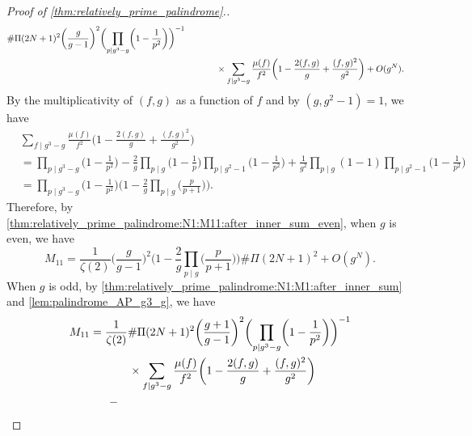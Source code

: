 \documentclass{amsart}
\theoremstyle{plain}
\theoremstyle{definition}
\begin{document}
\begin{proof}[Proof of \cref{thm:relatively_prime_palindrome}.]
\begin{equation}
\begin{aligned}
\#\Pi(2N+1)^{2}
\biggl(\frac{g}{g-1}\biggr)^{2}
\biggl(\prod_{p\mid g^{3}-g}\biggl(1-\frac{1}{p^{2}}\biggr)\biggr)^{-1}\\
&\hspace{0.1\textwidth}
\times
\sum_{f\mid g^{3}-g}
\frac{\mu(f)}{f^{2}}
\biggl(1-\frac{2(f,g)}{g}+\frac{(f,g)^{2}}{g^{2}}\biggr)
+
O(g^{N}).
\end{aligned}
\end{equation}
By the multiplicativity of $(f,g)$ as a function of $f$ and by $(g,g^{2}-1)=1$, we have
\begin{equation}
\label{thm:relatively_prime_palindrome:N1:M11:f_product}
\begin{aligned}
&\sum_{f\mid g^{3}-g}
\frac{\mu(f)}{f^{2}}
\biggl(1-\frac{2(f,g)}{g}+\frac{(f,g)^{2}}{g^{2}}\biggr)\\
&=
\prod_{p\mid g^{3}-g}\biggl(1-\frac{1}{p^{2}}\biggr)
-
\frac{2}{g}
\prod_{p\mid g}\biggl(1-\frac{1}{p}\biggr)
\prod_{p\mid g^{2}-1}\biggl(1-\frac{1}{p^{2}}\biggr)
+
\frac{1}{g^{2}}
\prod_{p\mid g}(1-1)
\prod_{p\mid g^{2}-1}\biggl(1-\frac{1}{p^{2}}\biggr)\\
&=
\prod_{p\mid g^{3}-g}\biggl(1-\frac{1}{p^{2}}\biggr)
\biggl(
1-\frac{2}{g}\prod_{p\mid g}\biggl(\frac{p}{p+1}\biggr)
\biggr).
\end{aligned}
\end{equation}
Therefore, by \cref{thm:relatively_prime_palindrome:N1:M11:after_inner_sum_even}, when $g$ is even, we have
\begin{equation}
\label{thm:relatively_prime_palindrome:N1:M11:g_even}
M_{11}
=
\frac{1}{\zeta(2)}
\biggl(\frac{g}{g-1}\biggr)^{2}
\biggl(
1-\frac{2}{g}\prod_{p\mid g}\biggl(\frac{p}{p+1}\biggr)
\biggr)
\#\Pi(2N+1)^{2}
+
O(g^{N}).
\end{equation}
When $g$ is odd,
by \cref{thm:relatively_prime_palindrome:N1:M1:after_inner_sum}
and \cref{lem:palindrome_AP_g3_g},
we have
\begin{equation}
\label{thm:relatively_prime_palindrome:N1:M11:after_inner_sum_odd}
\begin{aligned}
M_{11}
&=
\frac{1}{\zeta(2)}
\#\Pi(2N+1)^{2}
\biggl(\frac{g+1}{g-1}\biggr)^{2}
\biggl(\prod_{p\mid g^{3}-g}\biggl(1-\frac{1}{p^{2}}\biggr)\biggr)^{-1}\\
&\hspace{0.1\textwidth}
\times
\sum_{f\mid g^{3}-g}
\frac{\mu(f)}{f^{2}}
\biggl(1-\frac{2(f,g)}{g}+\frac{(f,g)^{2}}{g^{2}}\biggr)\\
&\hspace{0.05\textwidth}
-

\end{aligned}
\end{equation}
\end{proof}
\end{document}
